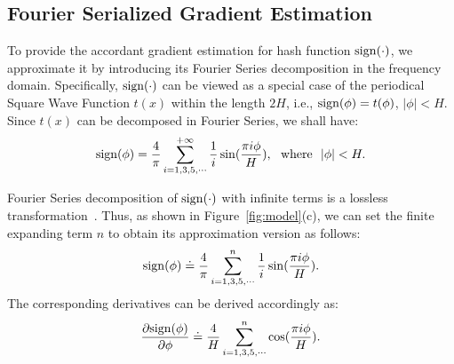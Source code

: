 \subsection{Fourier Serialized Gradient Estimation}
\label{sec:ge}

To provide the accordant gradient estimation for hash function $\operatorname{sign}(\cdot)$, we approximate it by introducing its Fourier Series decomposition in the frequency domain. 
Specifically, $\operatorname{sign}(\cdot)$ can be viewed as a special case of the periodical Square Wave Function $t(x)$ within the length $2H$, i.e., $\operatorname{sign}(\phi) = t(\phi)$, $|\phi| < H$.  
Since $t(x)$ can be decomposed in Fourier Series, we shall have: 
\begin{equation}
\setlength\abovedisplayskip{2pt}
\setlength\belowdisplayskip{2pt}
\sign(\phi) = \frac{4}{\pi}\sum_{i=1,3,5,\cdots}^{+\infty}\frac{1}{i}\sin(\frac{\pi i\phi}{H}), {\rm \ \ where \ \ } |\phi| < H.
\end{equation}



Fourier Series decomposition of $\operatorname{sign}(\cdot)$ with infinite terms is a lossless transformation~\cite{rust2013convergence}.
Thus, as shown in Figure~\ref{fig:model}(c), we can set the finite expanding term $n$ to obtain its approximation version as follows: 
\begin{equation}
\setlength\abovedisplayskip{2pt}
\setlength\belowdisplayskip{2pt}
{\sign(\phi)} \doteq \frac{4}{\pi}\sum_{i=1,3,5,\cdots}^{n}\frac{1}{i}\sin(\frac{\pi i\phi}{H}).  \\
\end{equation}
The corresponding derivatives can be derived accordingly as:
\begin{equation}
\setlength\abovedisplayskip{2pt}
\setlength\belowdisplayskip{2pt}
\label{eq:gradient}
\frac{\partial{{\sign(\phi)}}}{\partial \phi}   \doteq \frac{4}{H} \sum_{i=1,3,5,\cdots}^{n} \cos(\frac{\pi i\phi}{H}). 
\end{equation}



